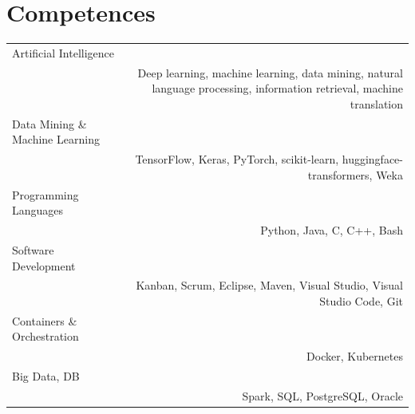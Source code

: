 \documentclass[10pt]{article}
\begin{document}
\section*{Competences}
\begin{tabular}{L!{\VRule}R}
Artificial Intelligence\\&Deep learning, machine learning, data mining, natural language processing, information retrieval, machine translation\\
Data Mining \& Machine Learning\\&TensorFlow, Keras, PyTorch, scikit-learn, huggingface-transformers, Weka\\
Programming Languages\\&Python, Java, C, C++, Bash\\
Software Development\\&Kanban, Scrum, Eclipse, Maven, Visual Studio, Visual Studio Code, Git\\
Containers \& Orchestration\\ & Docker, Kubernetes\\
Big Data, DB\\& Spark, SQL, PostgreSQL, Oracle\\
\end{tabular}
\end{document}
